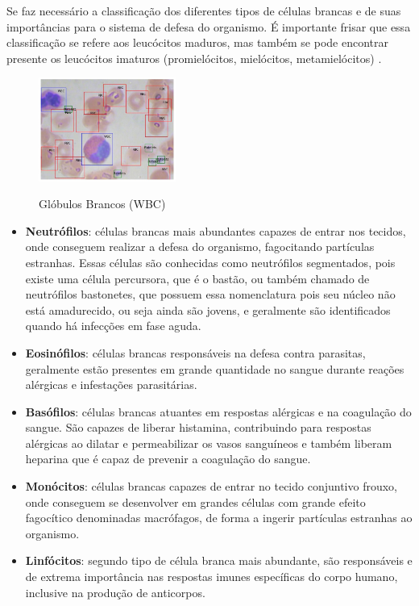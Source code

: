 Se faz necessário a classificação dos diferentes tipos de células brancas e de suas importâncias para o sistema de defesa do organismo. É importante frisar que essa classificação se refere aos leucócitos maduros, mas também se pode encontrar presente os leucócitos imaturos (promielócitos, mielócitos, metamielócitos) \cite{manualHematologia}.

\begin{figure}[!htb]
	\centering
	\caption{Glóbulos Brancos (WBC)}
	\includegraphics[width=0.40\textwidth]{img/wbc.jpg}
	\label{fig:wbc}
\end{figure}
 
\begin{itemize}
	\item \textbf{Neutrófilos}: células brancas mais abundantes capazes de entrar nos tecidos, onde conseguem realizar a defesa do organismo, fagocitando partículas estranhas. Essas células são conhecidas como neutrófilos segmentados, pois existe uma célula percursora, que é o bastão, ou também chamado de neutrófilos bastonetes, que possuem essa nomenclatura pois seu núcleo não está amadurecido, ou seja ainda são jovens, e geralmente são identificados quando há infecções em fase aguda. 
	\item \textbf{Eosinófilos}: células brancas responsáveis na defesa contra parasitas, geralmente estão presentes em grande quantidade no sangue durante reações alérgicas e infestações parasitárias.
	\item \textbf{Basófilos}: células brancas atuantes em respostas alérgicas e na coagulação do sangue. São capazes de liberar histamina, contribuindo para respostas alérgicas ao dilatar e permeabilizar os vasos sanguíneos e também liberam heparina que é capaz de prevenir a coagulação do sangue.
	\item \textbf{Monócitos}: células brancas capazes de entrar no tecido conjuntivo frouxo, onde conseguem se desenvolver em grandes células com grande efeito fagocítico denominadas macrófagos, de forma a ingerir partículas estranhas ao organismo.
	\item \textbf{Linfócitos}: segundo tipo de célula branca mais abundante, são responsáveis e de extrema importância nas respostas imunes específicas do corpo humano, inclusive na produção de anticorpos.
\end{itemize}

